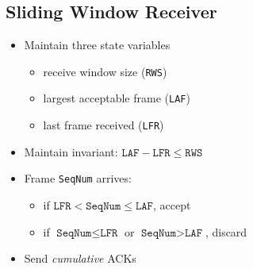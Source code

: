 \subsection{Sliding Window Receiver}
\begin{itemize}[nosep]
    \item Maintain three state variables
          \begin{itemize}[nosep]
              \item receive window size (\texttt{RWS})
              \item largest acceptable frame (\texttt{LAF})
              \item last frame received (\texttt{LFR})
          \end{itemize}
    \item Maintain invariant: $\texttt{LAF} - \texttt{LFR} \leq \texttt{RWS}$
    \item Frame \texttt{SeqNum} arrives:
          \begin{itemize}[nosep]
              \item if $\texttt{LFR} < \texttt{SeqNum} \leq \texttt{LAF}$, accept
              \item if $\texttt{SeqNum} \leq \texttt{LFR}$ or $\texttt{SeqNum} > \texttt{LAF}$, discard
          \end{itemize}
    \item Send \emph{cumulative} ACKs
\end{itemize}